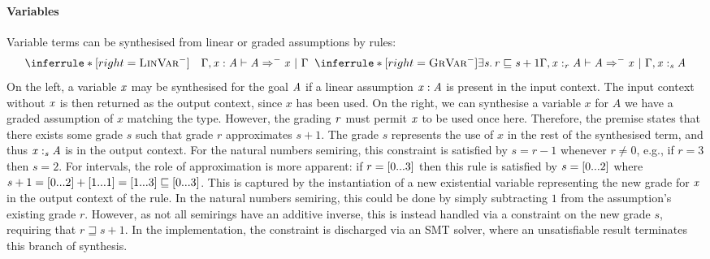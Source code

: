   \paragraph{Variables}
Variable terms can be synthesised from linear or graded assumptions by rules:
%
  \begin{align*}
  \subLinVar
  \;\;
  \subGrVar
  \end{align*}
%
On the left, a variable $\mathit{x}$ may be synthesised for the goal
$\mathit{A}$ if a linear assumption $\mathit{x}  :  \mathit{A}$ is present
  in the input context. The input context without $\mathit{x}$ is then returned as
  the output context, since $x$ has been used. On the right,
  we can synthesise a variable $x$ for $A$ we have a graded
  assumption of $x$ matching the type. However, %
  the grading $\mathit{r}$ must permit $\mathit{x}$ to
  be used once here. Therefore, the premise states that there exists
  some grade $s$ such that grade $r$ approximates $s + 1$. The grade $s$
  represents the use of $x$ in the rest of the synthesised term, and
  thus $\GRANULEmv{x}  :_{\textcolor{coeffectColor}{  \GRANULEnt{s}  } }   \GRANULEnt{A}$ is in the output context. For the natural
  numbers semiring, this constraint is satisfied by $s = r - 1$ whenever $r \neq
  0$, e.g., if $r = 3$ then $s = 2$. For
  intervals, the role of approximation is more apparent: if $r = [   0   ...  3  ]$ then this rule is satisfied by $s = [   0   ...  2  ]$
  where $s + 1 = [   0   ...  2  ] + [   1   ...   1   ] = [   1   ...  3  ]
  \sqsubseteq [   0   ...  3  ]$.
  This is captured by the instantiation of a new
  existential variable representing the new grade for $\mathit{x}$ in the output
  context of the rule. In the natural numbers semiring, this could be done by
  simply subtracting $1$ from the assumption's
  existing grade $r$. However, as not all semirings have an
  additive inverse, this is instead handled via a constraint on the new grade
  $s$, requiring that $ r \sqsupseteq s + 1 $. In the implementation, the constraint is
  discharged via an SMT solver, where an unsatisfiable result terminates
  this branch of synthesis.

